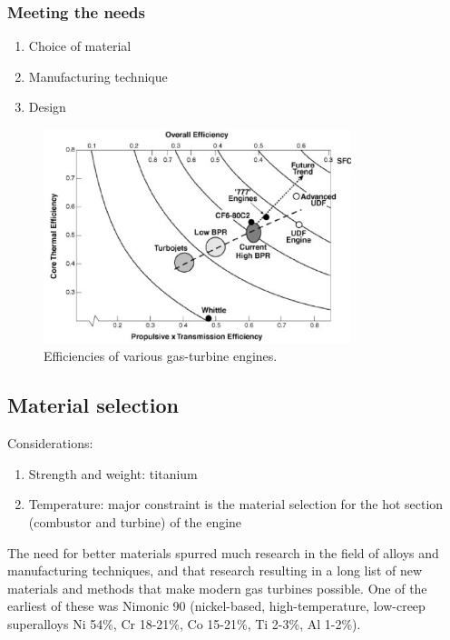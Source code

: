 \subsubsection{Meeting the needs}
\begin{enumerate}
    \item Choice of material
    \item Manufacturing technique
    \item Design
\end{enumerate}
\begin{figure}[H]
    \centering
    \includegraphics[width =0.8\textwidth]{img/figure22.png}
    \caption{Efficiencies of various gas-turbine engines.}
\end{figure}
\subsection{Material selection}
Considerations:
\begin{enumerate}
    \item Strength and weight: titanium
    \item Temperature: major constraint is the material selection for the hot section (combustor and turbine) of the engine
\end{enumerate}
The need for better materials spurred much research in the field of alloys and manufacturing techniques, and that research resulting in a long list of new materials and methods that make modern gas turbines possible. One of the earliest of these was Nimonic 90 (nickel-based, high-temperature, low-creep superalloys Ni 54\%, Cr 18-21\%, Co 15-21\%, Ti 2-3\%, Al 1-2\%).


